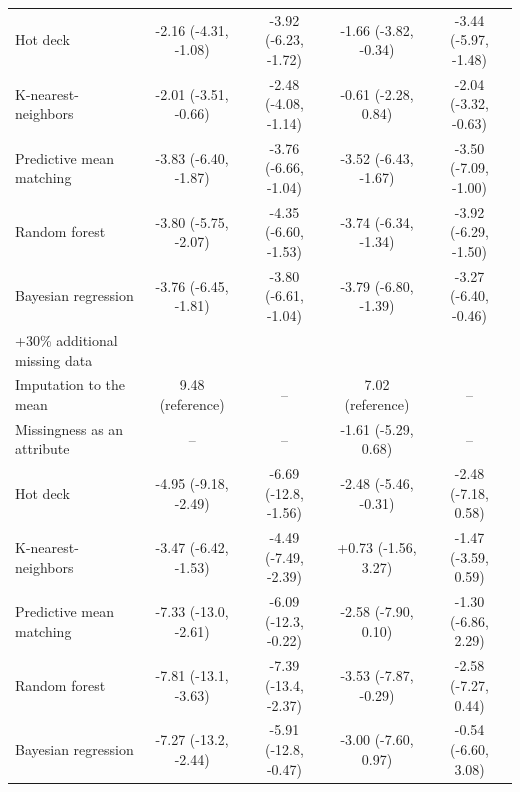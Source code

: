 \documentclass{article}
\begin{document}
\begin{table}
\begin{tabular}{lcccc}
Hot deck & -2.16 (-4.31, -1.08) & -3.92 (-6.23, -1.72) & -1.66 (-3.82, -0.34) & -3.44 (-5.97, -1.48) \\ 
K-nearest-neighbors & -2.01 (-3.51, -0.66) & -2.48 (-4.08, -1.14) & -0.61 (-2.28, 0.84) & -2.04 (-3.32, -0.63) \\ 
Predictive mean matching & -3.83 (-6.40, -1.87) & -3.76 (-6.66, -1.04) & -3.52 (-6.43, -1.67) & -3.50 (-7.09, -1.00) \\ 
Random forest & -3.80 (-5.75, -2.07) & -4.35 (-6.60, -1.53) & -3.74 (-6.34, -1.34) & -3.92 (-6.29, -1.50) \\ 
Bayesian regression & -3.76 (-6.45, -1.81) & -3.80 (-6.61, -1.04) & -3.79 (-6.80, -1.39) & -3.27 (-6.40, -0.46) \\ 
\midrule
\multicolumn{1}{l}{+30\% additional missing data} \\ 
\midrule
Imputation to the mean & 9.48 (reference) & -- & 7.02 (reference) & -- \\ 
Missingness as an attribute & -- & -- & -1.61 (-5.29, 0.68) & -- \\ 
Hot deck & -4.95 (-9.18, -2.49) & -6.69 (-12.8, -1.56) & -2.48 (-5.46, -0.31) & -2.48 (-7.18, 0.58) \\ 
K-nearest-neighbors & -3.47 (-6.42, -1.53) & -4.49 (-7.49, -2.39) & +0.73 (-1.56, 3.27) & -1.47 (-3.59, 0.59) \\ 
Predictive mean matching & -7.33 (-13.0, -2.61) & -6.09 (-12.3, -0.22) & -2.58 (-7.90, 0.10) & -1.30 (-6.86, 2.29) \\ 
Random forest & -7.81 (-13.1, -3.63) & -7.39 (-13.4, -2.37) & -3.53 (-7.87, -0.29) & -2.58 (-7.27, 0.44) \\ 
Bayesian regression & -7.27 (-13.2, -2.44) & -5.91 (-12.8, -0.47) & -3.00 (-7.60, 0.97) & -0.54 (-6.60, 3.08) \\ 
\bottomrule
\end{tabular} 
 \end{table}

\clearpage
\end{document}
